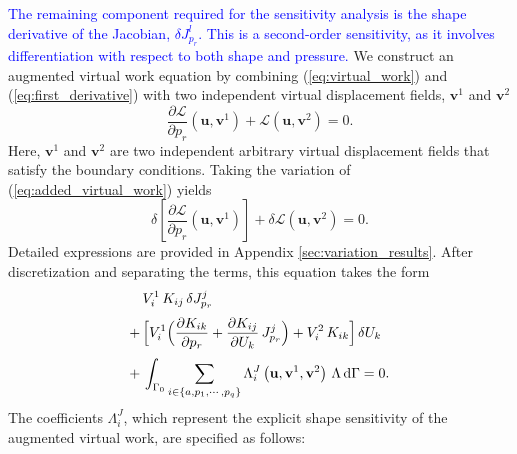 \documentclass[journal]{IEEEtran}
\theoremstyle{definition}
\begin{document}
\textcolor{blue}{The remaining component required for the sensitivity analysis is the shape derivative of the Jacobian, $\delta J^l_{p_r}$. This is a second-order sensitivity, as it involves differentiation with respect to both shape and pressure.} We construct an augmented virtual work equation by combining (\ref{eq:virtual_work}) and (\ref{eq:first_derivative}) with two independent virtual displacement fields, $\mathbf{v}^1$ and $\mathbf{v}^2$
\begin{equation}
  \frac{\partial \mathcal{L}}{\partial p_r}\left(\mathbf{u}, \mathbf{v}^1\right) + \mathcal{L}\left(\mathbf{u}, \mathbf{v}^2\right) = 0.
  \label{eq:added_virtual_work}
\end{equation}
Here, $\mathbf{v}^1$ and $\mathbf{v}^2$ are two independent arbitrary virtual displacement fields that satisfy the boundary conditions. Taking the variation of (\ref{eq:added_virtual_work}) yields
\begin{equation}
  \delta \left[ \frac{\partial \mathcal{L}}{\partial p_r}\left(\mathbf{u}, \mathbf{v}^1\right) \right] + \delta \mathcal{L}\left(\mathbf{u}, \mathbf{v}^2\right) = 0.
  \label{eq:variation_added_virtual_work}
\end{equation}
Detailed expressions are provided in Appendix \ref{sec:variation_results}. After discretization and separating the terms, this equation takes the form
\begin{equation}
  \begin{split}
    &V_i^1\,K_{ij}\,\delta J^j_{p_r}\\[1mm]
    +\,&\Bigl[V_i^1\Bigl(\frac{\partial K_{ik}}{\partial p_r} + \frac{\partial K_{ij}}{\partial U_k}\,J^j_{p_r} \Bigr) + V_i^2\,K_{ik}\Bigr]\,\delta U_k\\[1mm]
    +\,&\int_{\Gamma_0} \sum_{i\in\{a,p_1,\cdots,p_q\}} \Lambda_i^J\left(\mathbf{u},\mathbf{v}^1,\mathbf{v}^2\right)\,\Lambda \,\mathrm{d}\Gamma = 0.
  \end{split}
  \label{eq:discreted_variation_2nd_virtual_work}
\end{equation}
The coefficients $\Lambda_i^J$, which represent the explicit shape sensitivity of the augmented virtual work, are specified as follows:
\end{document}
